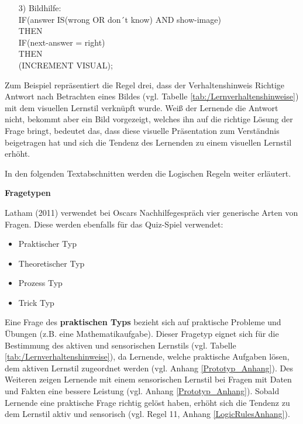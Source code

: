 \begingroup
  \footnotesize  
\begin{enumerate} 
  \item[3)] Bildhilfe:\\
  IF(answer IS(wrong OR don´t know) AND show-image)\\
  THEN\\
  IF(next-answer = right)\\
  THEN\\
  (INCREMENT VISUAL);
\end{enumerate}
\endgroup  

Zum Beispiel repräsentiert die Regel drei, dass der Verhaltenshinweis 
\glqq Richtige Antwort nach Betrachten eines Bildes\grqq{} (vgl. Tabelle \ref{tab:/Lernverhaltenshinweise}) 
mit dem visuellen Lernstil verknüpft wurde.
Weiß der Lernende die Antwort nicht, bekommt aber ein Bild vorgezeigt, welches ihn
auf die richtige Lösung der Frage bringt, bedeutet das, dass diese visuelle Präsentation zum Verständnis
beigetragen hat und sich die Tendenz des Lernenden zu einem visuellen Lernstil erhöht.

In den folgenden Textabschnitten werden die Logischen Regeln weiter erläutert.

\textbf{Fragetypen} \label{Fragetypen}

Latham (2011) verwendet bei Oscars Nachhilfegespräch
vier generische Arten von Fragen. \parencite[70f.]{Latham.2011}
Diese werden ebenfalls für das Quiz-Spiel verwendet:

\begin{minipage}[t]{0.5\textwidth}
\begin{itemize}
  \item Praktischer Typ
  \item Theoretischer Typ
\end{itemize}
\end{minipage}
\begin{minipage}[t]{0.5\textwidth}
  \begin{itemize}
  \item Prozess Typ
  \item Trick Typ \\
\end{itemize}
\end{minipage}

Eine Frage des \textbf{praktischen Typs} bezieht sich auf praktische Probleme und Übungen (z.B. eine Mathematikaufgabe). \parencite[74]{Latham.2011}
Dieser Fragetyp eignet sich für die Bestimmung des aktiven und sensorischen Lernstils (vgl. Tabelle \ref{tab:/Lernverhaltenshinweise}),
da Lernende, welche praktische Aufgaben lösen, dem aktiven Lernstil zugeordnet werden (vgl. Anhang \ref{Prototyp_Anhang}).
Des Weiteren zeigen Lernende mit einem sensorischen Lernstil 
bei Fragen mit Daten und Fakten eine bessere Leistung (vgl. Anhang \ref{Prototyp_Anhang}).
Sobald Lernende eine praktische Frage richtig gelöst haben, erhöht sich die Tendenz zu dem Lernstil aktiv und sensorisch (vgl. Regel 11, Anhang \ref{LogicRulesAnhang}).

